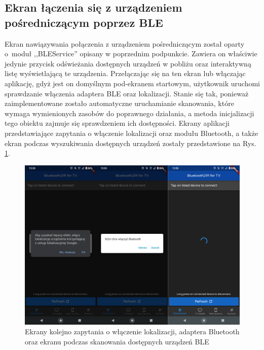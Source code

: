 \documentclass[12pt,twoside]{article}
\begin{document}
\subsection{Ekran łączenia się z urządzeniem pośredniczącym poprzez BLE}
Ekran nawiązywania połączenia z urządzeniem pośredniczącym został oparty o~moduł ,,BLEService'' opisany w poprzednim podpunkcie. Zawiera on właściwie jedynie przycisk odświeżania dostępnych urządzeń w pobliżu oraz interaktywną listę wyświetlającą te urządzenia.
Przełączając się na ten ekran lub włączając aplikację, gdyż jest on domyślnym pod-ekranem startowym, użytkownik uruchomi sprawdzanie włączenia adaptera BLE oraz lokalizacji. Stanie się tak, ponieważ zaimplementowane zostało automatyczne uruchamianie skanowania, które wymaga wymienionych zasobów do poprawnego działania, a metoda inicjalizacji tego obiektu zajmuje się sprawdzeniem ich dostępności. Ekrany aplikacji przedstawiające zapytania o włączenie lokalizacji oraz modułu Bluetooth, a także ekran podczas wyszukiwania dostępnych urządzeń zostały przedstawione na Rys. \ref*{Fig:initBLE}.
\begin{figure}[ht]
   \centering
   \includegraphics[width=14cm]{images/initBLE.png}
   \caption{Ekrany kolejno zapytania o włączenie lokalizacji, adaptera Bluetooth oraz ekranu podczas skanowania dostępnych urządzeń BLE}
   \label{Fig:initBLE}
\end{figure}
\end{document}
